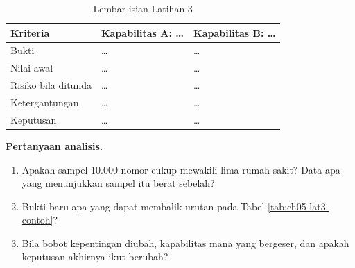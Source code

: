\begin{table}[!htb]
  \centering
  \caption{Lembar isian Latihan 3}
  \label{tab:ch05-lat3-hasil}
  \small
  \begin{tabularx}{\textwidth}{>{\raggedright\arraybackslash}p{2.6cm}>{\raggedright\arraybackslash}X>{\raggedright\arraybackslash}X}
    \hline
    \textbf{Kriteria} & \textbf{Kapabilitas A: \dots} & \textbf{Kapabilitas B: \dots} \\
    \hline
    Bukti & \dots & \dots \\
    \hline
    Nilai awal & \dots & \dots \\
    \hline
    Risiko bila ditunda & \dots & \dots \\
    \hline
    Ketergantungan & \dots & \dots \\
    \hline
    Keputusan & \dots & \dots \\
    \hline
  \end{tabularx}
\end{table}

\textbf{Pertanyaan analisis.}

\begin{enumerate}
  \item Apakah sampel 10.000 nomor cukup mewakili lima rumah sakit? Data apa yang menunjukkan sampel itu berat sebelah?
  \item Bukti baru apa yang dapat membalik urutan pada Tabel \ref{tab:ch05-lat3-contoh}?
  \item Bila bobot kepentingan diubah, kapabilitas mana yang bergeser, dan apakah keputusan akhirnya ikut berubah?
\end{enumerate}
